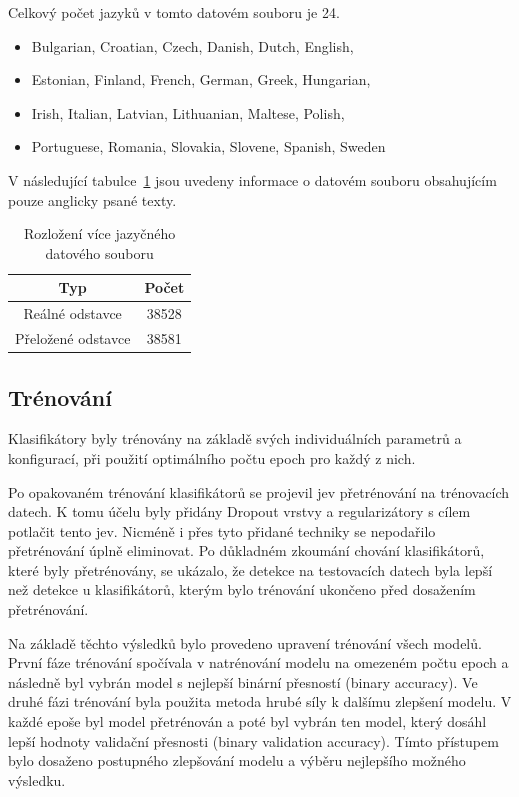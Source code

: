 Celkový počet jazyků v tomto datovém souboru je 24.
\begin{itemize}\label{Jazyky EU}
    \item Bulgarian, Croatian, Czech, Danish, Dutch, English,
    \item Estonian, Finland, French, German, Greek, Hungarian,
    \item Irish, Italian, Latvian, Lithuanian, Maltese, Polish,
    \item Portuguese, Romania, Slovakia, Slovene, Spanish, Sweden
\end{itemize} 

V následující tabulce~\ref{tab:Multi dataset} jsou uvedeny informace o datovém souboru obsahujícím pouze anglicky psané texty.

\begin{table}[H]
	\centering
	\caption{Rozložení více jazyčného datového souboru}\label{tab:Multi dataset}
	\begin{tabular}{ c c }
			\toprule
			Typ & Počet\\
			\midrule
			Reálné odstavce & 38528\\
			Přeložené odstavce & 38581\\
			\midrule
		\end{tabular}
\end{table}

\subsection{Trénování}
Klasifikátory byly trénovány na základě svých individuálních parametrů a konfigurací, při použití optimálního počtu epoch pro každý z nich.

Po opakovaném trénování klasifikátorů se projevil jev přetrénování na trénovacích datech.
K tomu účelu byly přidány Dropout vrstvy a regularizátory s cílem potlačit tento jev.
Nicméně i přes tyto přidané techniky se nepodařilo přetrénování úplně eliminovat.
Po důkladném zkoumání chování klasifikátorů, které byly přetrénovány, se ukázalo, že detekce na testovacích datech byla lepší než detekce u klasifikátorů, kterým bylo trénování ukončeno před dosažením přetrénování.

Na základě těchto výsledků bylo provedeno upravení trénování všech modelů.
První fáze trénování spočívala v natrénování modelu na omezeném počtu epoch a následně byl vybrán model s nejlepší binární přesností (binary accuracy).
Ve druhé fázi trénování byla použita metoda hrubé síly k dalšímu zlepšení modelu.
V každé epoše byl model přetrénován a poté byl vybrán ten model, který dosáhl lepší hodnoty validační přesnosti (binary validation accuracy).
Tímto přístupem bylo dosaženo postupného zlepšování modelu a výběru nejlepšího možného výsledku.

